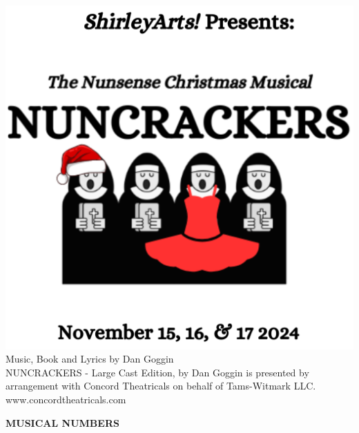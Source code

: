 \documentclass[12pt, a5paper, oneside]{article}
\begin{document}
\newcommand\song[2]{\item\raggedright\textbf{#1}\dotfill \raggedleft\emph{#2}\par}
\newcommand\cast[2]{{#2}\dotfill \emph{#1}\newline}
\newcommand\crew[2]{\raggedright\textbf{#1}\dotfill \raggedleft\emph{#2}\par}
\newcommand\choir[1]{\centering\emph{#1}\par}
\pagestyle{empty} %
\setlength\parindent{0em} %

\begin{center}

\includegraphics[scale=0.6]{media/program_cover.png}
\\
\Large Music, Book and Lyrics by 
Dan Goggin \\ 
\hfill\newline
\normalsize
NUNCRACKERS - Large Cast Edition, by Dan Goggin is presented by arrangement with Concord Theatricals on behalf of Tams-Witmark LLC. \\
www.concordtheatricals.com


\end{center}

\pagebreak
\begin{center}
\Large \textbf{MUSICAL NUMBERS}
\end{center}
\end{document}
